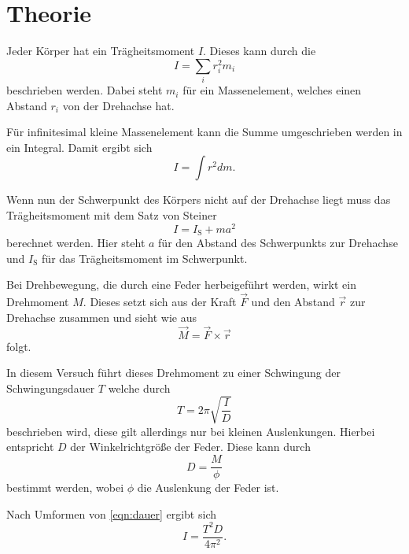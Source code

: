 \section{Theorie}
\label{sec:Theorie}

Jeder Körper hat ein Trägheitsmoment $I$.
Dieses kann durch die 
\begin{equation*}
    I = \sum_i r_i^2 m_i
\end{equation*}
beschrieben werden. Dabei steht $m_i$ für ein Massenelement, welches einen Abstand $r_i$ von der Drehachse hat.

Für infinitesimal kleine Massenelement kann die Summe umgeschrieben werden in ein Integral.
Damit ergibt sich 
\begin{equation*}
    I = \int r^2 dm .
\end{equation*}

Wenn nun der Schwerpunkt des Körpers nicht auf der Drehachse liegt muss das Trägheitsmoment mit dem Satz von Steiner
\begin{equation}
    I = I_\text{S} + m a^2
    \label{eqn:steiner}
\end{equation}
berechnet werden. Hier steht $a$ für den Abstand des Schwerpunkts zur Drehachse und $I_\text{S}$ für das Trägheitsmoment im Schwerpunkt.

Bei Drehbewegung, die durch eine Feder herbeigeführt werden, wirkt ein Drehmoment $M$.
Dieses setzt sich aus der Kraft $\vec{F}$ und den Abstand $\vec{r}$ zur Drehachse zusammen und sieht wie aus
\begin{equation*}
    \vec{M} = \vec{F} \times \vec{r}
\end{equation*} 
folgt.

In diesem Versuch führt dieses Drehmoment zu einer Schwingung der Schwingungsdauer $T$ welche durch 
\begin{equation}
    T = 2\pi \sqrt{\frac{I}{D}}
    \label{eqn:dauer}
\end{equation}
beschrieben wird, diese gilt allerdings nur bei kleinen Auslenkungen.
Hierbei entspricht $D$ der Winkelrichtgröße der Feder.
Diese kann durch 
\begin{equation}
    D = \frac{M}{\phi}
    \label{eqn:federstarke}
\end{equation}
bestimmt werden, wobei $\phi$ die Auslenkung der Feder ist.

Nach Umformen von \ref{eqn:dauer} ergibt sich
\begin{equation}
    I = \frac{T^2 D}{4 \pi^2} .
    \label{eqn:tragheit}
\end{equation}

